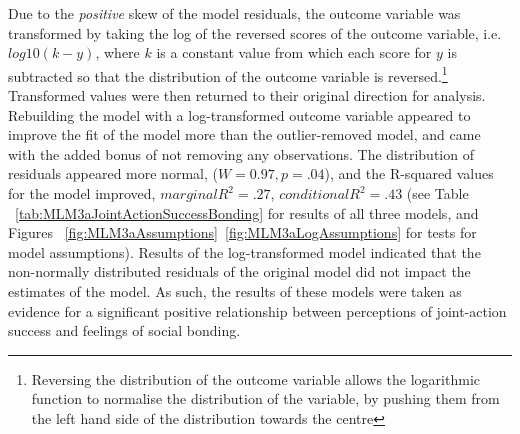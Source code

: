 \documentclass[12pt]{report}
\begin{document}
{Due to the \textit{positive} skew of the model residuals, the outcome variable was transformed by taking the log of the reversed scores of the outcome variable, i.e. $log10(k - y)$, where $k$ is a constant value from which each score for $y$ is subtracted so that the distribution of the outcome variable is reversed\citep{Howell2012}.\footnote{Reversing the distribution of the outcome variable allows the logarithmic function to normalise the distribution of the variable, by pushing them from the left hand side of the distribution towards the centre}  Transformed values were then returned to their original direction for analysis\citep{Field2012}.  Rebuilding the model with a log-transformed outcome variable appeared to improve the fit of the model more than the outlier-removed model, and came with the added bonus of not removing any observations. The distribution of residuals appeared more normal, ($W = 0.97, p = .04$), and the R-squared values for the model improved, $marginal R^2 = .27$, $conditional R^2 = .43$ (see Table ~\ref{tab:MLM3aJointActionSuccessBonding} for results of all three models, and Figures ~\ref{fig:MLM3aAssumptions}\nobreakdash~\ref{fig:MLM3aLogAssumptions} for tests for model assumptions).  Results of the log-transformed model indicated that the non-normally distributed residuals of the original model did not impact the estimates of the model. As such, the results of these models were taken as evidence for a significant positive relationship between perceptions of joint-action success and feelings of social bonding.



}
\end{document}
